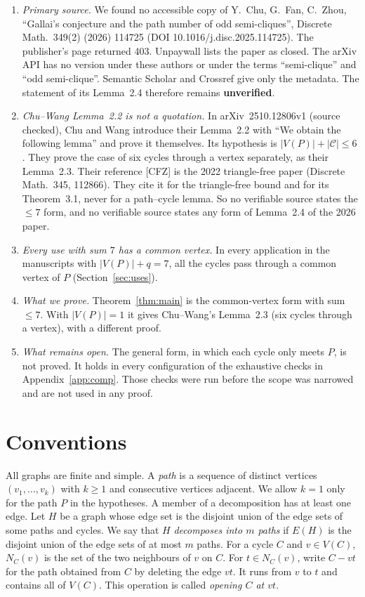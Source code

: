 \documentclass[11pt]{amsart}
\theoremstyle{definition}
\theoremstyle{remark}
\newcommand{\cyc}{\mathcal{C}}
\begin{document}
\begin{enumerate}[leftmargin=*]
\item \emph{Primary source.} We found no accessible copy of Y.~Chu, G.~Fan, C.~Zhou, ``Gallai's
conjecture and the path number of odd semi-cliques'', Discrete Math.\ 349(2) (2026) 114725
(DOI 10.1016/j.disc.2025.114725). The publisher's page returned 403. Unpaywall lists the paper
as closed. The arXiv API has no version under these authors or under the terms ``semi-clique''
and ``odd semi-clique''. Semantic Scholar and Crossref give only the metadata. The statement of
its Lemma~2.4 therefore remains \textbf{unverified}.

\item \emph{Chu--Wang Lemma~2.2 is not a quotation.} In arXiv~2510.12806v1 (source checked),
Chu and Wang introduce their Lemma~2.2 with ``We obtain the following lemma'' and prove it
themselves. Its hypothesis is $|V(P)|+|\cyc|\le 6$. They prove the case of six cycles through a
vertex separately, as their Lemma~2.3. Their reference [CFZ] is the 2022 triangle-free paper
(Discrete Math.\ 345, 112866). They cite it for the triangle-free bound and for its
Theorem~3.1, never for a path--cycle lemma. So no verifiable source
states the $\le 7$ form, and no verifiable source states any form of Lemma~2.4 of the 2026 paper.

\item \emph{Every use with sum $7$ has a common vertex.} In every application in the manuscripts with
$|V(P)|+q=7$, all the cycles pass through a common vertex of $P$ (Section~\ref{sec:uses}).

\item \emph{What we prove.} Theorem~\ref{thm:main} is the common-vertex form with sum
$\le 7$. With $|V(P)|=1$ it gives Chu--Wang's Lemma~2.3 (six cycles through a vertex), with a
different proof.

\item \emph{What remains open.} The general form, in which each cycle only meets $P$, is not
proved. It holds in every configuration of the exhaustive checks in
Appendix~\ref{app:comp}. Those checks were run before the scope was narrowed and are not used in
any proof.
\end{enumerate}

\section{Conventions}

All graphs are finite and simple. A \emph{path} is a sequence of distinct vertices
$(v_1,\dots,v_k)$ with $k\ge 1$ and consecutive vertices adjacent. We allow $k=1$ only for the
path $P$ in the hypotheses. A member of a decomposition has at least one edge. Let $H$ be a graph
whose edge set is the disjoint union of the edge sets of some paths and cycles. We say that $H$
\emph{decomposes into $m$ paths} if $E(H)$ is the disjoint union of the edge sets of at most $m$
paths. For a cycle $C$ and $v\in V(C)$, $N_C(v)$ is the set of the two neighbours of $v$ on $C$.
For $t\in N_C(v)$, write $C-vt$ for the path obtained from $C$ by deleting the edge $vt$. It runs
from $v$ to $t$ and contains all of $V(C)$. This operation is called \emph{opening $C$ at $vt$}.
\end{document}
